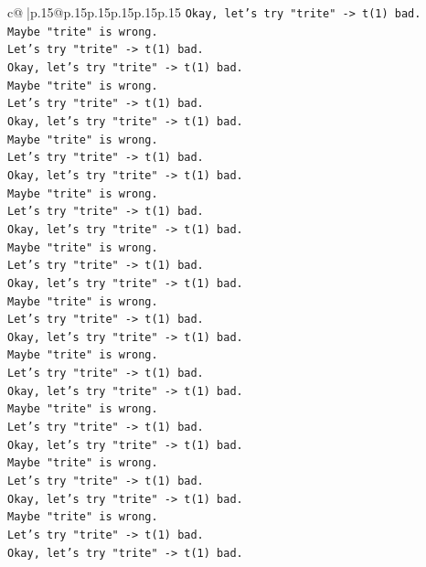 \documentclass{article}
\begin{document}
{\begin{supertabular}{c@{$\;$}|p{.15\linewidth}@{}p{.15\linewidth}p{.15\linewidth}p{.15\linewidth}p{.15\linewidth}p{.15\linewidth}}
{{{\texttt{Okay, let's try "trite" {-}> t(1) bad.} \\
\texttt{Maybe "trite" is wrong.} \\
\texttt{Let's try "trite" {-}> t(1) bad.} \\
\texttt{Okay, let's try "trite" {-}> t(1) bad.} \\
\texttt{Maybe "trite" is wrong.} \\
\texttt{Let's try "trite" {-}> t(1) bad.} \\
\texttt{Okay, let's try "trite" {-}> t(1) bad.} \\
\texttt{Maybe "trite" is wrong.} \\
\texttt{Let's try "trite" {-}> t(1) bad.} \\
\texttt{Okay, let's try "trite" {-}> t(1) bad.} \\
\texttt{Maybe "trite" is wrong.} \\
\texttt{Let's try "trite" {-}> t(1) bad.} \\
\texttt{Okay, let's try "trite" {-}> t(1) bad.} \\
\texttt{Maybe "trite" is wrong.} \\
\texttt{Let's try "trite" {-}> t(1) bad.} \\
\texttt{Okay, let's try "trite" {-}> t(1) bad.} \\
\texttt{Maybe "trite" is wrong.} \\
\texttt{Let's try "trite" {-}> t(1) bad.} \\
\texttt{Okay, let's try "trite" {-}> t(1) bad.} \\
\texttt{Maybe "trite" is wrong.} \\
\texttt{Let's try "trite" {-}> t(1) bad.} \\
\texttt{Okay, let's try "trite" {-}> t(1) bad.} \\
\texttt{Maybe "trite" is wrong.} \\
\texttt{Let's try "trite" {-}> t(1) bad.} \\
\texttt{Okay, let's try "trite" {-}> t(1) bad.} \\
\texttt{Maybe "trite" is wrong.} \\
\texttt{Let's try "trite" {-}> t(1) bad.} \\
\texttt{Okay, let's try "trite" {-}> t(1) bad.} \\
\texttt{Maybe "trite" is wrong.} \\
\texttt{Let's try "trite" {-}> t(1) bad.} \\
\texttt{Okay, let's try "trite" {-}> t(1) bad.} \\
}}}
\end{supertabular}}
\end{document}
